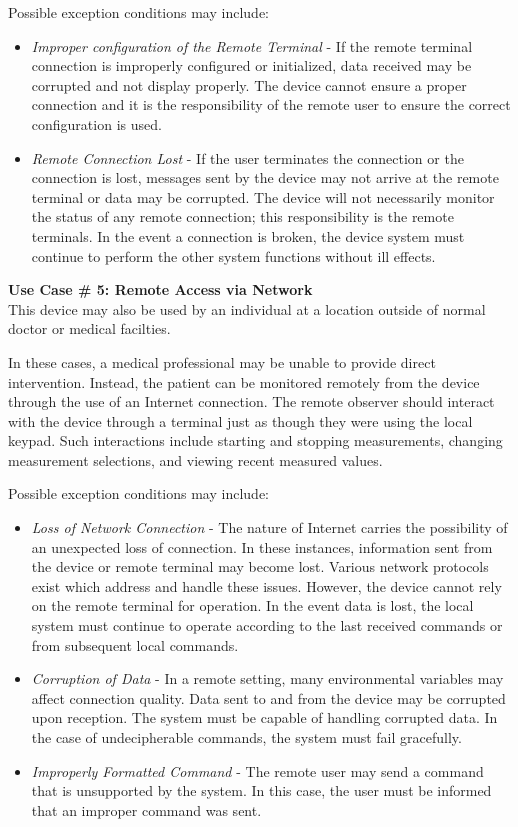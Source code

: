 \documentclass[12pt]{article} %
\begin{document}
Possible exception conditions may include:
\begin{itemize}
  \item \emph{Improper configuration of the Remote Terminal} - If the remote
    terminal connection is improperly configured or initialized, data received
    may be corrupted and not display properly. The device cannot ensure a
    proper connection and it is the responsibility of the remote user to ensure
    the correct configuration is used.
  \item \emph{Remote Connection Lost} - If the user terminates the connection
    or the connection is lost, messages sent by the device may not arrive at
    the remote terminal or data may be corrupted. The device will not
    necessarily monitor the status of any remote connection; this
    responsibility is the remote terminals. In the event a connection is
    broken, the device system must continue to perform the other system
    functions without ill effects.
\end{itemize}

\textbf{Use Case \# 5: Remote Access via Network} \\
This device may also be used by an individual at a location outside of normal
doctor or medical facilties.

In these cases, a medical professional may be unable to provide direct
intervention. Instead, the patient can be monitored remotely from the device
through the use of an Internet connection. The remote observer should interact
with the device through a terminal just as though they were using the local
keypad. Such interactions include starting and stopping measurements, changing
measurement selections, and viewing recent measured values.

Possible exception conditions may include:
\begin{itemize}
	\item \emph{Loss of Network Connection} - The nature of Internet carries the
		possibility of an unexpected loss of connection. In these instances,
		information sent from the device or remote terminal may become lost.
		Various network protocols exist which address and handle these
		issues. However, the device cannot rely on the remote terminal for
		operation. In the event data is lost, the local system must
		continue to operate according to the last received commands or from
		subsequent local commands.
	\item \emph{Corruption of Data} - In a remote setting, many environmental
		variables may affect connection quality. Data sent to and from the device
		may be corrupted upon reception. The system must be capable of handling
		corrupted data. In the case of undecipherable commands, the system must
		fail gracefully.
	\item \emph{Improperly Formatted Command} - The remote user may send a
		command that is unsupported by the system. In this case, the user must be
		informed that an improper command was sent.
\end{itemize}
\end{document}
